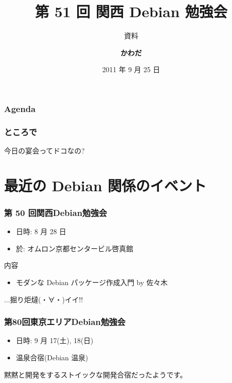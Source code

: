 \documentclass[cjk,dvipdfmx,12pt,%
hyperref={bookmarks=true,bookmarksnumbered=true,bookmarksopen=false,%
colorlinks=false,%
pdftitle={第 51 回 関西 Debian 勉強会},%
pdfauthor={倉敷・のがた・佐々木},%
pdfsubject={資料},%
}]{beamer}
\title{第 51 回 関西 Debian 勉強会}
\subtitle{{\small 資料}}
\author[佐々木 洋平]{{\large\bf かわだ}}
\institute[Debian JP]{{\normalsize\tt 関西 Debian 勉強会}}
\date{{\small 2011 年 9 月 25 日}}
\begin{document}
\settitleslide
\begin{frame}
\titlepage
\end{frame}
\setdefaultslide

\begin{frame}[fragile]
\frametitle{Agenda}
\tableofcontents
\end{frame}

\begin{frame}[fragile]
\frametitle{ところで}

今日の宴会ってドコなの?

\end{frame}

\section{最近の Debian 関係のイベント}


\begin{frame}[fragile]
\frametitle{第 50 回関西Debian勉強会}

\begin{itemize}
\item 日時: 8 月 28 日
\item 於: オムロン京都センタービル啓真館
\end{itemize}

\begin{block}{内容}
  \begin{itemize}
  \item モダンな Debian パッケージ作成入門 by 佐々木
  \end{itemize}
  ...掘り炬燵(・∀・)イイ!!
\end{block}
\end{frame}



\begin{frame}[fragile]
  \frametitle{第80回東京エリアDebian勉強会}
  \begin{itemize}
  \item 日時: 9 月 17(土), 18(日)
  \item 温泉合宿(Debian 温泉)
  \end{itemize}
  \begin{center}
    黙黙と開発をするストイックな開発合宿だったようです。
  \end{center}
  \centering

\end{frame}
\end{document}
